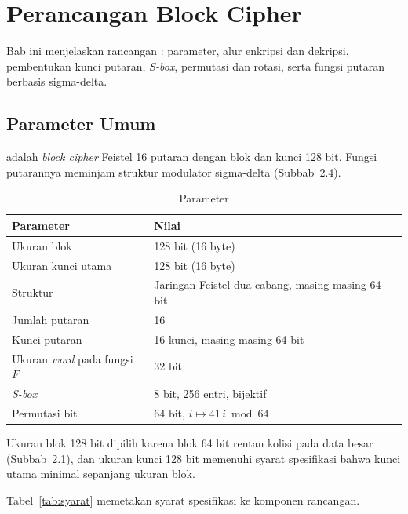 \section{Perancangan Block Cipher}
Bab ini menjelaskan rancangan \algname{}: parameter, alur enkripsi dan dekripsi, pembentukan kunci
putaran, \textit{S-box}, permutasi dan rotasi, serta fungsi putaran berbasis sigma-delta.

\subsection{Parameter Umum}
\algname{} adalah \textit{block cipher} Feistel 16 putaran dengan blok dan kunci 128 bit. Fungsi
putarannya meminjam struktur modulator sigma-delta (Subbab~2.4).

\begin{table}[H]
  \centering
  \caption{Parameter \algname{}}
  \begin{tabular}{ll}
    \toprule
    Parameter & Nilai \\
    \midrule
    Ukuran blok & 128 bit (16 byte) \\
    Ukuran kunci utama & 128 bit (16 byte) \\
    Struktur & Jaringan Feistel dua cabang, masing-masing 64 bit \\
    Jumlah putaran & 16 \\
    Kunci putaran & 16 kunci, masing-masing 64 bit \\
    Ukuran \textit{word} pada fungsi $F$ & 32 bit \\
    \textit{S-box} & 8 bit, 256 entri, bijektif \\
    Permutasi bit & 64 bit, $i \mapsto 41\,i \bmod 64$ \\
    \bottomrule
  \end{tabular}
\end{table}

Ukuran blok 128 bit dipilih karena blok 64 bit rentan kolisi pada data besar (Subbab~2.1),
dan ukuran kunci 128 bit memenuhi syarat spesifikasi bahwa kunci utama minimal sepanjang
ukuran blok.

Tabel~\ref{tab:syarat} memetakan syarat spesifikasi ke komponen rancangan.


